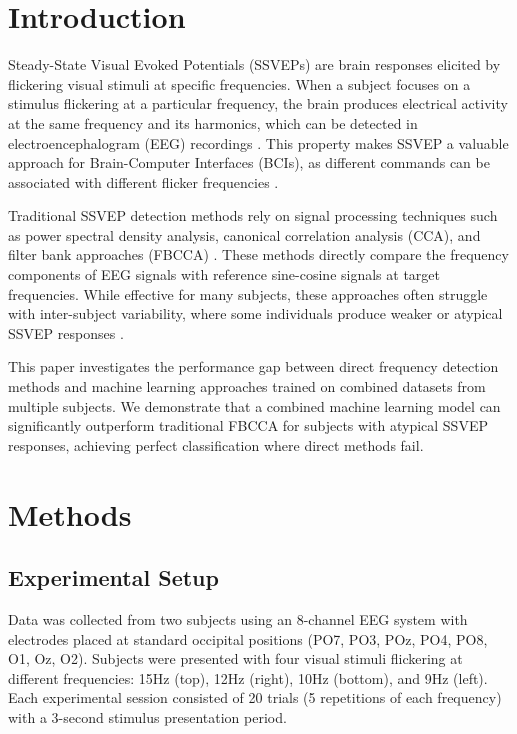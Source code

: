 \documentclass[conference]{IEEEtran}
\begin{document}
\section{Introduction}
Steady-State Visual Evoked Potentials (SSVEPs) are brain responses elicited by flickering visual stimuli at specific frequencies. When a subject focuses on a stimulus flickering at a particular frequency, the brain produces electrical activity at the same frequency and its harmonics, which can be detected in electroencephalogram (EEG) recordings \cite{vialatte2010steady}. This property makes SSVEP a valuable approach for Brain-Computer Interfaces (BCIs), as different commands can be associated with different flicker frequencies \cite{wang2006practical}.

Traditional SSVEP detection methods rely on signal processing techniques such as power spectral density analysis, canonical correlation analysis (CCA), and filter bank approaches (FBCCA) \cite{chen2015filter}. These methods directly compare the frequency components of EEG signals with reference sine-cosine signals at target frequencies. While effective for many subjects, these approaches often struggle with inter-subject variability, where some individuals produce weaker or atypical SSVEP responses \cite{allison2010toward}.

This paper investigates the performance gap between direct frequency detection methods and machine learning approaches trained on combined datasets from multiple subjects. We demonstrate that a combined machine learning model can significantly outperform traditional FBCCA for subjects with atypical SSVEP responses, achieving perfect classification where direct methods fail.

\section{Methods}

\subsection{Experimental Setup}
Data was collected from two subjects using an 8-channel EEG system with electrodes placed at standard occipital positions (PO7, PO3, POz, PO4, PO8, O1, Oz, O2). Subjects were presented with four visual stimuli flickering at different frequencies: 15Hz (top), 12Hz (right), 10Hz (bottom), and 9Hz (left). Each experimental session consisted of 20 trials (5 repetitions of each frequency) with a 3-second stimulus presentation period.
\end{document}

